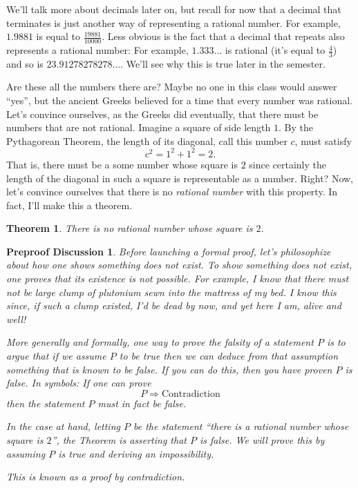 \documentclass[12pt]{amsart}
\numberwithin{equation}{section}
\theoremstyle{plain} %
\newtheorem{thm}[equation]{Theorem}
\newtheorem{preproof}{Preproof Discussion}
\theoremstyle{definition}
\theoremstyle{remark}
\begin{document}
We'll talk more about decimals later on, but recall for now that a decimal that terminates is just another way of representing a rational number. For example,
$1.9881$ is equal to $\frac{19881}{10000}$. Less obvious is the fact that a decimal that repeats also represents a rational number: For example, 
$1.333\dots$ is rational (it's equal to $\frac43$) and so is 
$23.91278278278\dots$. We'll see why this is true later in the semester. 




Are these all the numbers there are? Maybe no one in this class  would answer ``yes'', but the ancient Greeks believed for a time that every number was rational. Let's convince
ourselves, as the Greeks did eventually, that there must be numbers that are not rational. Imagine a square of side length $1$. By the Pythagorean Theorem, the length of
its diagonal, call this number $c$, must satisfy 
$$
c^2 = 1^2 + 1^2 = 2.
$$
That is, there must be a some  number whose square is $2$ since certainly the length of the diagonal in such a square is representable as a number. Right?
Now, let's convince ourselves that there is no {\em rational number} with this property. In fact, I'll make this a theorem.

\begin{thm} There is no rational number whose square is $2$. 
\end{thm}

\begin{preproof} Before launching a formal proof, let's philosophize
  about how one shows something does not exist. To show something does
  not exist, one proves  that its existence is
  not possible. For example, I know that  there must not be large clump of plutonium sewn into the mattress of my bed. I know this since, if such a clump existed, I'd be
  dead by now, and yet here I am, alive and well!

More generally and formally, one way to prove the falsity of a
statement $P$ is to argue that if we assume $P$ to be true then we can deduce from that
assumption something that is known
to be false. If you can do this, then you have proven $P$ is false. In symbols:
If one can prove
$$
P \Longrightarrow \text{Contradiction}
$$
then the statement $P$ must in fact be false.

In the case at hand, letting  $P$ be the statement ``there is a rational number whose square is $2$'', the Theorem is asserting that $P$ is false. We will prove
this by assuming $P$ is true and deriving an impossibility.

This is known as a proof by contradiction.\end{preproof}
\end{document}
